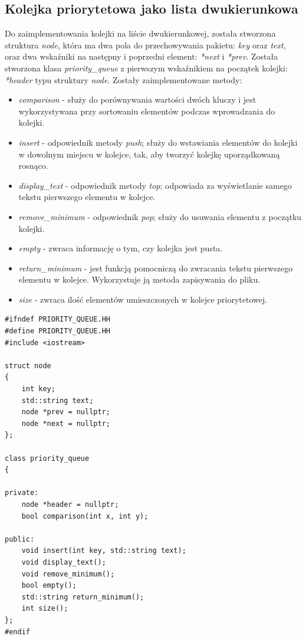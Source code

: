 \documentclass[12pt]{article}
\begin{document}
\subsection{Kolejka priorytetowa jako lista dwukierunkowa}
Do zaimplementowania kolejki na liście dwukierunkowej, została stworzona struktura \textit{node}, 
która ma dwa pola do przechowywania pakietu: \textit{key} oraz \textit{text}, oraz dwa wskaźniki 
na następny i poprzedni element: \textit{*next} i \textit{*prev}. Została stworzona klasa 
\textit{priority\_queue} z pierwszym wskaźnikiem na początek kolejki: \textit{*header} 
typu struktury \textit{node}. Zostały zaimplementowane metody:
\begin{itemize}
    \item \textit{comparison} - służy do porównywania wartości dwóch kluczy i jest 
    wykorzystywana przy sortowaniu elementów podczas wprowadzania do kolejki.
    \item \textit{insert} - odpowiednik metody \textit{push}; służy do wstawiania elementów 
    do kolejki w dowolnym miejscu w kolejce, tak, aby tworzyć kolejkę uporządkowaną rosnąco. 
    \item \textit{display\_text} - odpowiednik metody \textit{top}; odpowiada za
    wyświetlanie samego tekstu pierwszego elementu w kolejce.
    \item \textit{remove\_minimum} - odpowiednik \textit{pop}; służy do usuwania elementu z 
    początku kolejki. 
    \item \textit{empty} - zwraca informację o tym, czy kolejka jest pusta.
    \item \textit{return\_minimum} - jest funkcją pomocniczą do zwracania tekstu pierwszego 
    elementu w kolejce. Wykorzystuje ją metoda zapisywania do pliku. 
    \item \textit{size} - zwraca ilość elementów umieszczonych w kolejce priorytetowej.
\end{itemize}

\begin{lstlisting}
#ifndef PRIORITY_QUEUE.HH
#define PRIORITY_QUEUE.HH
#include <iostream>

struct node
{
    int key;
    std::string text;
    node *prev = nullptr;
    node *next = nullptr;
};

class priority_queue
{

private:
    node *header = nullptr;
    bool comparison(int x, int y);

public:
    void insert(int key, std::string text);
    void display_text();
    void remove_minimum(); 
    bool empty();
    std::string return_minimum();
    int size();
};
#endif
\end{lstlisting}
\end{document}
